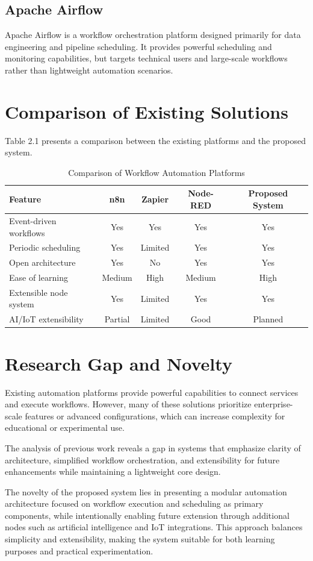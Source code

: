 \subsection{Apache Airflow}
Apache Airflow is a workflow orchestration platform designed primarily for data engineering and pipeline scheduling. It provides powerful scheduling and monitoring capabilities, but targets technical users and large-scale workflows rather than lightweight automation scenarios.

\section{Comparison of Existing Solutions}

Table 2.1 presents a comparison between the existing platforms and the proposed system.

\begin{table}[h]
\centering
\caption{Comparison of Workflow Automation Platforms}
\label{tab:comparison}
\begin{tabular}{|l|c|c|c|c|}
\hline
\textbf{Feature} & \textbf{n8n} & \textbf{Zapier} & \textbf{Node-RED} & \textbf{Proposed System} \\ \hline
Event-driven workflows & Yes & Yes & Yes & Yes \\ \hline
Periodic scheduling & Yes & Limited & Yes & Yes \\ \hline
Open architecture & Yes & No & Yes & Yes \\ \hline
Ease of learning & Medium & High & Medium & High \\ \hline
Extensible node system & Yes & Limited & Yes & Yes \\ \hline
AI/IoT extensibility & Partial & Limited & Good & Planned \\ \hline
\end{tabular}
\end{table}

\section{Research Gap and Novelty}

Existing automation platforms provide powerful capabilities to connect services and execute workflows. However, many of these solutions prioritize enterprise-scale features or advanced configurations, which can increase complexity for educational or experimental use.

The analysis of previous work reveals a gap in systems that emphasize clarity of architecture, simplified workflow orchestration, and extensibility for future enhancements while maintaining a lightweight core design. 

The novelty of the proposed system lies in presenting a modular automation architecture focused on workflow execution and scheduling as primary components, while intentionally enabling future extension through additional nodes such as artificial intelligence and IoT integrations. This approach balances simplicity and extensibility, making the system suitable for both learning purposes and practical experimentation.
